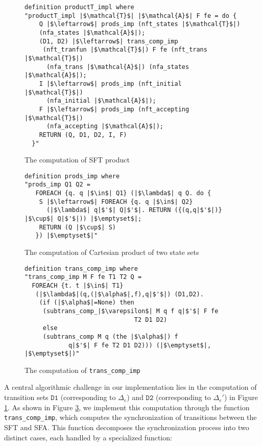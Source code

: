 \documentclass[sigplan,10pt,anonymous,review]{acmart}\settopmatter{printfolios=true,printccs=false,printacmref=false}
\begin{document}
\begin{figure}[hbt!]
	\begin{lstlisting}
definition productT_impl where
"productT_impl |$\mathcal{T}$| |$\mathcal{A}$| F fe = do {
    Q |$\leftarrow$| prods_imp (nft_states |$\mathcal{T}$|) 
    (nfa_states |$\mathcal{A}$|);
    (D1, D2) |$\leftarrow$| trans_comp_imp 
     (nft_tranfun |$\mathcal{T}$|) F fe (nft_trans |$\mathcal{T}$|) 
      (nfa_trans |$\mathcal{A}$|) (nfa_states |$\mathcal{A}$|);
    I |$\leftarrow$| prods_imp (nft_initial |$\mathcal{T}$|)
      (nfa_initial |$\mathcal{A}$|);
    F |$\leftarrow$| prods_imp (nft_accepting |$\mathcal{T}$|) 
      (nfa_accepting |$\mathcal{A}$|);
    RETURN (Q, D1, D2, I, F)
  }"
\end{lstlisting}
\caption{The computation of SFT product}
\label{fig-compute-nft-product}
\end{figure}



\begin{figure}[hbt!]
	\begin{lstlisting}
definition prods_imp where
"prods_imp Q1 Q2 =
   FOREACH {q. q |$\in$| Q1} (|$\lambda$| q Q. do {
    S |$\leftarrow$| FOREACH {q. q |$\in$| Q2}
      (|$\lambda$| q|$'$| Q|$'$|. RETURN ({(q,q|$'$|)} |$\cup$| Q|$'$|)) |$\emptyset$|;
    RETURN (Q |$\cup$| S)
   }) |$\emptyset$|"
\end{lstlisting}
\caption{The computation of Cartesian product of two state sets}
\label{fig-def-prods_imp}
\end{figure}



\begin{figure}[hbt!]
	\begin{lstlisting}
definition trans_comp_imp where
"trans_comp_imp M F fe T1 T2 Q =
  FOREACH {t. t |$\in$| T1}
   (|$\lambda$|(q,(|$\alpha$|,f),q|$'$|) (D1,D2). 
    (if (|$\alpha$|=None) then 
     (subtrans_comp_|$\varepsilon$| M q f q|$'$| F fe 
                              T2 D1 D2)
     else
     (subtrans_comp M q (the |$\alpha$|) f 
            q|$'$| F fe T2 D1 D2))) (|$\emptyset$|, |$\emptyset$|)"
\end{lstlisting}
\caption{The computation of \texttt{trans\_comp\_imp}}
\label{fig-def-prods-imp}
\end{figure}

A central algorithmic challenge in our implementation lies in the computation of transition sets $\texttt{D1}$ (corresponding to $\Delta_e$) and $\texttt{D2}$ (corresponding to $\Delta_e'$) in Figure \ref{fig-compute-nft-product}. As shown in Figure \ref{fig-def-prods-imp}, we implement this computation through the function \texttt{trans\_comp\_imp}, which computes the synchronization of transitions between the SFT and SFA. This function decomposes the synchronization process into two distinct cases, each handled by a specialized function:
\end{document}
